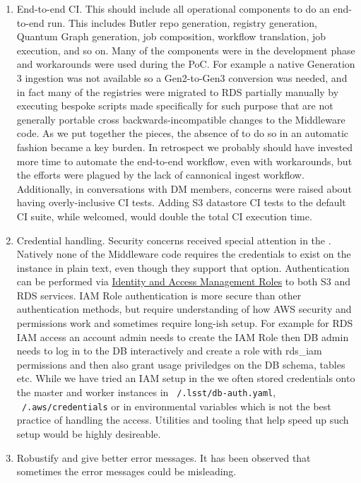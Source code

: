 \begin{enumerate}
\item End-to-end CI.
This should include all operational components to do an end-to-end run.
This includes Butler repo generation, registry generation, Quantum Graph generation, job composition, workflow translation, job execution, and so on.
Many of the components were in the development phase and workarounds were used during the PoC.
For example a native Generation 3 ingestion was not available so a Gen2-to-Gen3 conversion was needed, and in fact many of the registries were migrated to RDS partially manually by executing bespoke scripts made specifically for such purpose that are not generally portable cross backwards-incompatible changes to the Middleware code.
As we put together the pieces, the absence of to do so in an automatic fashion became a key burden.
In retrospect we probably should have invested more time to automate the end-to-end workflow, even with workarounds, but the efforts were plagued by the lack of cannonical ingest workflow. Additionally, in conversations with DM members, concerns were raised about having overly-inclusive CI tests. Adding S3 datastore CI tests to the default CI suite, while welcomed, would double the total CI execution time.
\item Credential handling.
Security concerns received special attention in the \poc. Natively none of the Middleware code requires the credentials to exist on the instance in plain text, even though they support that option. Authentication can be performed via \href{https://docs.aws.amazon.com/IAM/latest/UserGuide/id_roles.html}{Identity and Access Management Roles} to both S3 and RDS services. IAM Role authentication is more secure than other authentication methods, but require understanding of how AWS security and permissions work and sometimes require long-ish setup. For example for RDS IAM access an account admin needs to create the IAM Role then DB admin needs to log in to the DB interactively and create a role with rds\_iam permissions and then also grant usage priviledges on the DB schema, tables etc. While we have tried an IAM setup in the \poc we often stored credentials onto the master and worker instances in \texttt{~/.lsst/db-auth.yaml}, \texttt{~/.aws/credentials} or in environmental variables which is not the best practice of handling the access. Utilities and tooling that help speed up such setup would be highly desireable. 
\item Robustify and give better error messages.
It has been observed that sometimes the error messages could be misleading.

\end{enumerate}

